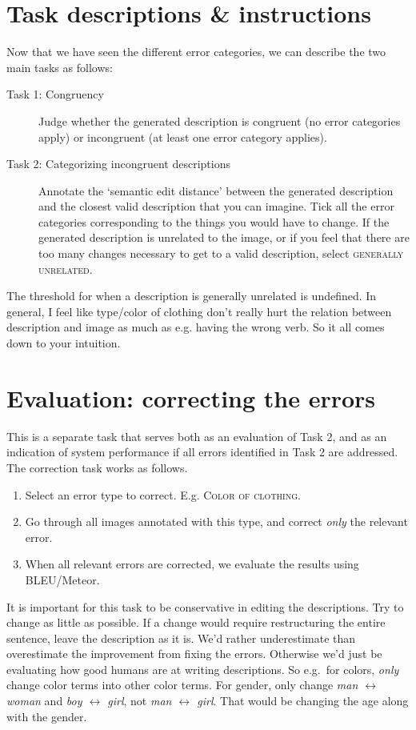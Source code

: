 \documentclass[11pt,a4paper]{article}
\begin{document}
\section{Task descriptions \& instructions}
Now that we have seen the different error categories, we can describe the two main tasks as follows:

\begin{description}
\item[Task 1: Congruency] Judge whether the generated description is congruent (no error categories apply) or incongruent (at least one error category applies).

\item[Task 2: Categorizing incongruent descriptions] Annotate the `semantic edit distance' between the generated description and the closest valid description that you can imagine. Tick all the error categories corresponding to the things you would have to change. If the generated description is unrelated to the image, or if you feel that there are too many changes necessary to get to a valid description, select \textsc{generally unrelated}.
\end{description}

The threshold for when a description is generally unrelated is undefined. In general, I feel like type/color of clothing don't really hurt the relation between description and image as much as e.g. having the wrong verb. So it all comes down to your intuition.

\section{Evaluation: correcting the errors}
This is a separate task that serves both as an evaluation of Task 2, and as an indication of system performance if all errors identified in Task 2 are addressed. The correction task works as follows.

\begin{enumerate}
\item Select an error type to correct. E.g. \textsc{Color of clothing}. 
\item Go through all images annotated with this type, and correct \emph{only} the relevant error.
\item When all relevant errors are corrected, we evaluate the results using BLEU/Meteor.
\end{enumerate}

It is important for this task to be conservative in editing the descriptions. Try to change as little as possible. If a change would require restructuring the entire sentence, leave the description as it is. We'd rather underestimate than overestimate the improvement from fixing the errors. Otherwise we'd just be evaluating how good humans are at writing descriptions. So e.g.\ for colors, \emph{only} change color terms into other color terms. For gender, only change \emph{man $\leftrightarrow$ woman} and \emph{boy $\leftrightarrow$ girl}, not \emph{man $\leftrightarrow$ girl}. That would be changing the age along with the gender. 
\end{document}
